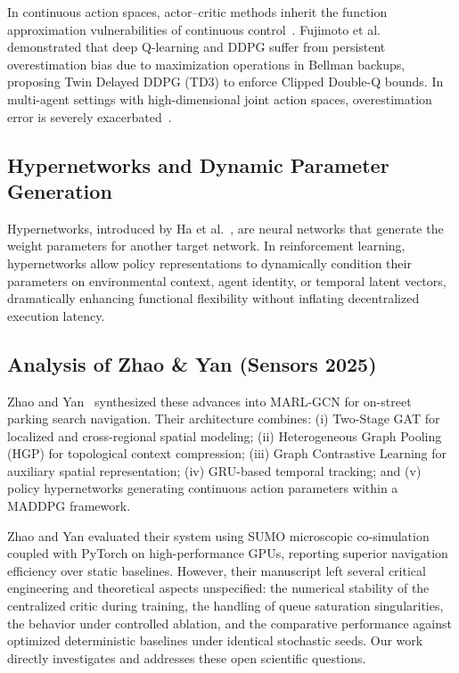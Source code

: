 \documentclass[journal]{IEEEtran}
\begin{document}
In continuous action spaces, actor--critic methods inherit the function approximation vulnerabilities of continuous control~\cite{lillicrap2016continuous}. Fujimoto et al.~\cite{fujimoto2018addressing} demonstrated that deep Q-learning and DDPG suffer from persistent overestimation bias due to maximization operations in Bellman backups, proposing Twin Delayed DDPG (TD3) to enforce Clipped Double-Q bounds. In multi-agent settings with high-dimensional joint action spaces, overestimation error is severely exacerbated~\cite{henderson2018deep,agarwal2021deep}.

\subsection{Hypernetworks and Dynamic Parameter Generation}
Hypernetworks, introduced by Ha et al.~\cite{ha2017hypernetworks}, are neural networks that generate the weight parameters for another target network. In reinforcement learning, hypernetworks allow policy representations to dynamically condition their parameters on environmental context, agent identity, or temporal latent vectors, dramatically enhancing functional flexibility without inflating decentralized execution latency.

\subsection{Analysis of Zhao \& Yan (Sensors 2025)}
Zhao and Yan~\cite{zhao2025deep} synthesized these advances into MARL-GCN for on-street parking search navigation. Their architecture combines: (i) Two-Stage GAT for localized and cross-regional spatial modeling; (ii) Heterogeneous Graph Pooling (HGP) for topological context compression; (iii) Graph Contrastive Learning for auxiliary spatial representation; (iv) GRU-based temporal tracking; and (v) policy hypernetworks generating continuous action parameters within a MADDPG framework. 

Zhao and Yan evaluated their system using SUMO microscopic co-simulation coupled with PyTorch on high-performance GPUs, reporting superior navigation efficiency over static baselines. However, their manuscript left several critical engineering and theoretical aspects unspecified: the numerical stability of the centralized critic during training, the handling of queue saturation singularities, the behavior under controlled ablation, and the comparative performance against optimized deterministic baselines under identical stochastic seeds. Our work directly investigates and addresses these open scientific questions.
\end{document}
